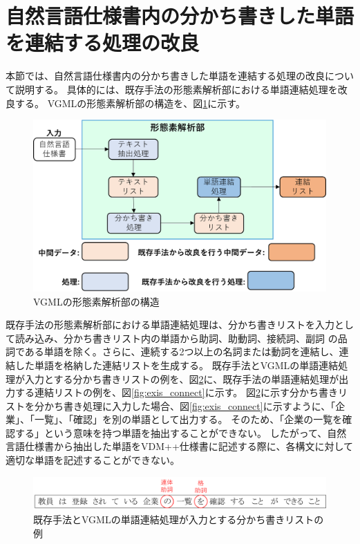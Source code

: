 \section{自然言語仕様書内の分かち書きした単語を連結する処理の改良}
本節では、自然言語仕様書内の分かち書きした単語を連結する処理の改良について説明する。
具体的には、既存手法の形態素解析部における単語連結処理を改良する。
VGMLの形態素解析部の構造を、図\ref{fig:vgml_mor_structure}に示す。

\begin{figure}[t]
    \begin{center}
        \includegraphics[width=1.0\columnwidth]{image/vgml_mor_structure.png}
        \caption{VGMLの形態素解析部の構造}
        \label{fig:vgml_mor_structure}
    \end{center}
\end{figure}

既存手法の形態素解析部における単語連結処理は、分かち書きリストを入力として読み込み、分かち書きリスト内の単語から助詞、助動詞、接続詞、副詞
の品詞である単語を除く。さらに、連続する2つ以上の名詞または動詞を連結し、連結した単語を格納した連結リストを生成する。
既存手法とVGMLの単語連結処理が入力とする分かち書きリストの例を、図\ref{fig:exis_wakati}に、既存手法の単語連結処理が出力する連結リストの例を、図\ref{fig:exis_connect}に示す。
図\ref{fig:exis_wakati}に示す分かち書きリストを分かち書き処理に入力した場合、図\ref{fig:exis_connect}に示すように、「企業」、「一覧」、「確認」を別の単語として出力する。
そのため、「企業の一覧を確認する」という意味を持つ単語を抽出することができない。
したがって、自然言語仕様書から抽出した単語をVDM++仕様書に記述する際に、各構文に対して適切な単語を記述することができない。

\begin{figure}[t]
    \begin{center}
        \includegraphics[width=1.0\columnwidth]{image/exis_wakati.png}
        \caption{既存手法とVGMLの単語連結処理が入力とする分かち書きリストの例}
        \label{fig:exis_wakati}
    \end{center}
\end{figure}

